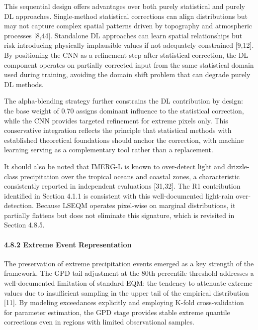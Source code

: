 \documentclass[
]{article}
\begin{document}
This sequential design offers advantages over both purely statistical
and purely DL approaches. Single-method statistical corrections can
align distributions but may not capture complex spatial patterns driven
by topography and atmospheric processes {[}8,44{]}. Standalone DL
approaches can learn spatial relationships but risk introducing
physically implausible values if not adequately constrained {[}9,12{]}.
By positioning the CNN as a refinement step after statistical
correction, the DL component operates on partially corrected input from
the same statistical domain used during training, avoiding the domain
shift problem that can degrade purely DL methods.

The alpha-blending strategy further constrains the DL contribution by
design: the base weight of 0.70 assigns dominant influence to the
statistical correction, while the CNN provides targeted refinement for
extreme pixels only. This conservative integration reflects the
principle that statistical methods with established theoretical
foundations should anchor the correction, with machine learning serving
as a complementary tool rather than a replacement.

It should also be noted that IMERG-L is known to over-detect light and
drizzle-class precipitation over the tropical oceans and coastal zones,
a characteristic consistently reported in independent evaluations
{[}31,32{]}. The R1 contribution identified in Section 4.1.1 is
consistent with this well-documented light-rain over-detection. Because
LSEQM operates pixel-wise on marginal distributions, it partially
flattens but does not eliminate this signature, which is revisited in
Section 4.8.5.

\paragraph{4.8.2 Extreme Event
Representation}\label{extreme-event-representation}

The preservation of extreme precipitation events emerged as a key
strength of the framework. The GPD tail adjustment at the 80th
percentile threshold addresses a well-documented limitation of standard
EQM: the tendency to attenuate extreme values due to insufficient
sampling in the upper tail of the empirical distribution {[}11{]}. By
modeling exceedances explicitly and employing K-fold cross-validation
for parameter estimation, the GPD stage provides stable extreme quantile
corrections even in regions with limited observational samples.
\end{document}
